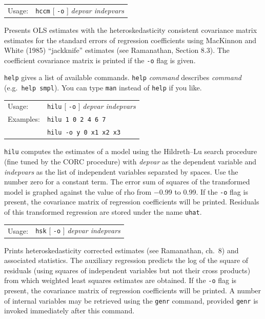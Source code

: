 \documentclass{article}
\begin{document}
{

\begin{tabular}{ll}
Usage: &  \texttt{hccm} [ \texttt{-o} ] \textit{depvar indepvars}  
\end{tabular}

Presents OLS estimates with the heteroskedasticity consistent
covariance matrix estimates for the standard errors of regression
coefficients using MacKinnon and White (1985) ``jackknife'' estimates
(see Ramanathan, Section 8.3).  The coefficient covariance matrix is
printed if the \texttt{-o} flag is given.


\texttt{help} gives a list of available commands.  \texttt{help}
\textit{command} describes \textit{command} (e.g.\ \texttt{help
  smpl}).  You can type \texttt{man} instead of \texttt{help} if you
like.  


\begin{tabular}{ll}
Usage: & \texttt{hilu} [ \texttt{-o} ] \textit{depvar indepvars} \\
Examples: & \texttt{hilu 1 0 2 4 6 7}  \\
          &  \texttt{hilu -o y 0 x1 x2 x3}
\end{tabular}
                
\texttt{hilu} computes the estimates of a model using the Hildreth--Lu
search procedure (fine tuned by the CORC procedure) with
\textit{depvar} as the dependent variable and \textit{indepvars} as
the list of independent variables separated by spaces.  Use the number
zero for a constant term.  The error sum of squares of the transformed
model is graphed against the value of rho from $-$0.99 to 0.99.  If
the \texttt{-o} flag is present, the covariance matrix of regression
coefficients will be printed.  Residuals of this transformed
regression are stored under the name \texttt{uhat}.


\begin{tabular}{ll}
Usage: & \texttt{hsk} [ \texttt{-o} ] \textit{depvar indepvars} 
\end{tabular} 

Prints heteroskedasticity corrected estimates (see Ramanathan, ch.\ 8)
and associated statistics.  The auxiliary regression predicts the log
of the square of residuals (using squares of independent variables but
not their cross products) from which weighted least squares estimates
are obtained.  If the \texttt{-o} flag is present, the covariance
matrix of regression coefficients will be printed.  A number of
internal variables may be retrieved using the \texttt{genr} command,
provided \texttt{genr} is invoked immediately after this command.

}
\end{document}
